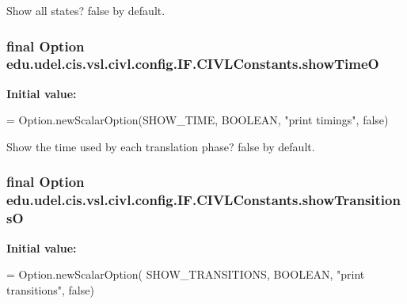 Show all states? false by default. 

\hypertarget{classedu_1_1udel_1_1cis_1_1vsl_1_1civl_1_1config_1_1IF_1_1CIVLConstants_a72c9697b7ccfd46796d824ca05113a28}{}
\subsubsection[{show\+Time\+O}]{\setlength{\rightskip}{0pt plus 5cm}final Option edu.\+udel.\+cis.\+vsl.\+civl.\+config.\+I\+F.\+C\+I\+V\+L\+Constants.\+show\+Time\+O\hspace{0.3cm}{\ttfamily [static]}}\label{classedu_1_1udel_1_1cis_1_1vsl_1_1civl_1_1config_1_1IF_1_1CIVLConstants_a72c9697b7ccfd46796d824ca05113a28}
{\bfseries Initial value\+:}
\begin{DoxyCode}
= Option.newScalarOption(SHOW\_TIME,
            BOOLEAN, \textcolor{stringliteral}{"print timings"}, \textcolor{keyword}{false})
\end{DoxyCode}


Show the time used by each translation phase? false by default. 

\hypertarget{classedu_1_1udel_1_1cis_1_1vsl_1_1civl_1_1config_1_1IF_1_1CIVLConstants_a5da0f4d2c2f981f3ca766f52e3229940}{}
\subsubsection[{show\+Transitions\+O}]{\setlength{\rightskip}{0pt plus 5cm}final Option edu.\+udel.\+cis.\+vsl.\+civl.\+config.\+I\+F.\+C\+I\+V\+L\+Constants.\+show\+Transitions\+O\hspace{0.3cm}{\ttfamily [static]}}\label{classedu_1_1udel_1_1cis_1_1vsl_1_1civl_1_1config_1_1IF_1_1CIVLConstants_a5da0f4d2c2f981f3ca766f52e3229940}
{\bfseries Initial value\+:}
\begin{DoxyCode}
= Option.newScalarOption(
            SHOW\_TRANSITIONS, BOOLEAN, \textcolor{stringliteral}{"print transitions"}, \textcolor{keyword}{false})
\end{DoxyCode}


